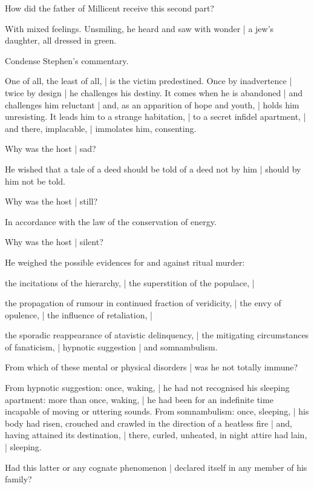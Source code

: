 How did the father of Millicent receive this second part?

\Factual
With mixed feelings.
Unsmiling, he heard and saw with wonder |
a jew's daughter, all dressed in green.


Condense Stephen's commentary.

\Stephen
One of all, the least of all, |
is the victim predestined.
Once by inadvertence |
twice by design |
he challenges his destiny.
It comes when he is abandoned |
and challenges him reluctant |
and, as an apparition of hope and youth, |
holds him unresisting.
It leads him to a strange habitation, |
to a secret infidel apartment, |
and there, implacable, |
immolates him, consenting.


Why was the host
 |
sad?

\Bloom
He wished that a tale of a deed should be told of a deed not by him |
should by him not be told.%


Why was the host
 |
still?

\Science
In accordance with the law of the conservation of energy.


Why was the host
 |
silent?

\Factual
He weighed the possible evidences for and against ritual murder:

\Poetry
the incitations of the hierarchy, |
the superstition of the populace, |

\Memories
the propagation of rumour in continued fraction of veridicity, |
the envy of opulence, |
the influence of retaliation, |

\Household
the sporadic reappearance of atavistic delinquency, |
the mitigating circumstances of fanaticism, |
hypnotic suggestion |
and somnambulism.


From which
of these mental or physical disorders |
was he not totally immune?

\Science
From hypnotic suggestion:
once, waking, |
he had not recognised his sleeping apartment:
more than once, waking, |
he had been for an indefinite time incapable of moving or uttering sounds.
From somnambulism:
once, sleeping, |
his body had risen, crouched and crawled in the direction of a heatless fire |
and, having attained its destination, |
there, curled, unheated, in night attire had lain, |
sleeping.


Had this latter or any cognate phenomenon |
declared itself in any member of his family?

